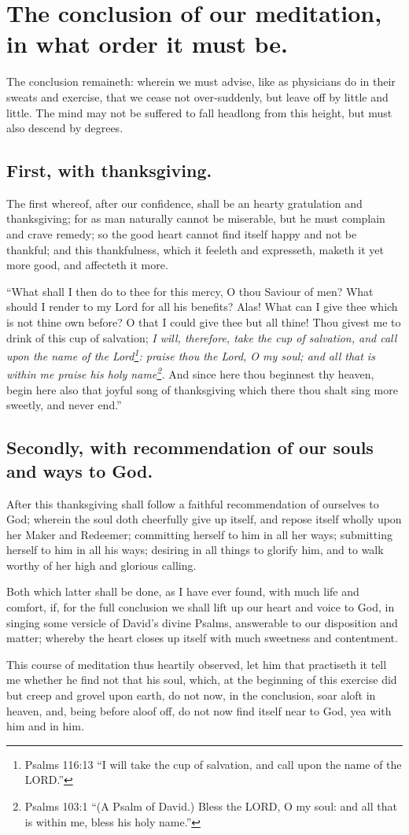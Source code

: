 \chapter{The conclusion of our meditation, in what order it must be.}
The conclusion remaineth: wherein we must advise, like as physicians do in their sweats and exercise, that we cease not over-suddenly, but leave off by little and little. The mind may not be suffered to fall headlong from this height, but must also descend by degrees. 

\section{First, with thanksgiving.}
The first whereof, after our confidence, shall be an hearty gratulation and thanksgiving; for as man naturally cannot be miserable, but he must complain and crave remedy; so the good heart cannot find itself happy and not be thankful; and this thankfulness, which it feeleth and expresseth, maketh it yet more good, and affecteth it more. 

``What shall I then do to thee for this mercy, O thou Saviour of men? What should I render to my Lord for all his benefits? Alas! What can I give thee which is not thine own before? O that I could give thee but all thine! Thou givest me to drink of this cup of salvation; \emph{I will, therefore, take the cup of salvation, and call upon the name of the Lord\footnote{Psalms 116:13 ``I will take the cup of salvation, and call upon the name of the LORD.''}: praise thou the Lord, O my soul; and all that is within me praise his holy name\footnote{Psalms 103:1 ``(A Psalm of David.) Bless the LORD, O my soul: and all that is within me, bless his holy name.'' }.} And since here thou beginnest thy heaven, begin here also that joyful song of thanksgiving which there thou shalt sing more sweetly, and never end.''

\section{Secondly, with recommendation of our souls and ways to God.}
After this thanksgiving shall follow a faithful recommendation of ourselves to God; wherein the soul doth cheerfully give up itself, and repose itself wholly upon her Maker and Redeemer; committing herself to him in all her ways; submitting herself to him in all his ways; desiring in all things to glorify him, and to walk worthy of her high and glorious calling. 

Both which latter shall be done, as I have ever found, with much life and comfort, if, for the full conclusion we shall lift up our heart and voice to God, in singing some versicle of David's divine Psalms, answerable to our disposition and matter; whereby the heart closes up itself with much sweetness and contentment. 

This course of meditation thus heartily observed, let him that practiseth it tell me whether he find not that his soul, which, at the beginning of this exercise did but creep and grovel upon earth, do not now, in the conclusion, soar aloft in heaven, and, being before aloof off, do not now find itself near to God, yea with him and in him. 